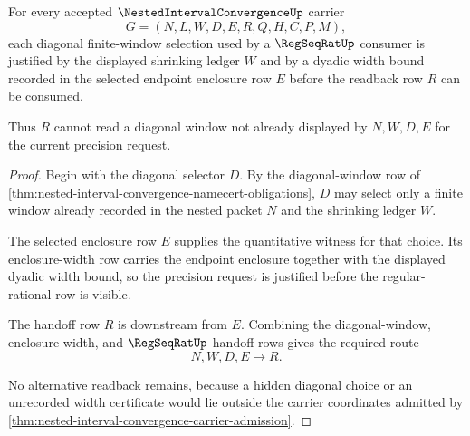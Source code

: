 \begin{theorem}
\label{thm:nested-interval-convergence-diagonal-window-exactness}
For every accepted $\NestedIntervalConvergenceUp$ carrier
$$
G=(N,L,W,D,E,R,Q,H,C,P,M),
$$
each diagonal finite-window selection used by a $\RegSeqRatUp$ consumer is justified by the displayed shrinking ledger $W$ and by a dyadic width bound recorded in the selected endpoint enclosure row $E$ before the readback row $R$ can be consumed.

Thus $R$ cannot read a diagonal window not already displayed by $N,W,D,E$ for the current precision request.
\end{theorem}
\begin{proof}
Begin with the diagonal selector $D$. By the diagonal-window row of \autoref{thm:nested-interval-convergence-namecert-obligations}, $D$ may select only a finite window already recorded in the nested packet $N$ and the shrinking ledger $W$.

The selected enclosure row $E$ supplies the quantitative witness for that choice. Its enclosure-width row carries the endpoint enclosure together with the displayed dyadic width bound, so the precision request is justified before the regular-rational row is visible.

The handoff row $R$ is downstream from $E$. Combining the diagonal-window, enclosure-width, and $\RegSeqRatUp$ handoff rows gives the required route
$$
N,W,D,E \longmapsto R .
$$

No alternative readback remains, because a hidden diagonal choice or an unrecorded width certificate would lie outside the carrier coordinates admitted by \autoref{thm:nested-interval-convergence-carrier-admission}.
\end{proof}

